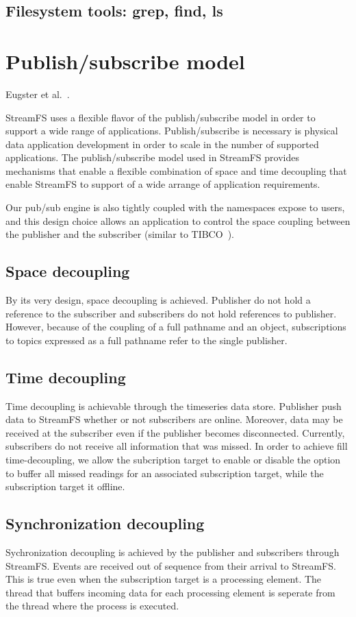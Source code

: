 \documentclass[10pt,print,letterpaper]{sigplan-proc-varsize}
\begin{document}
\subsection{Filesystem tools: grep, find, ls}

\section{Publish/subscribe model}
Eugster et al.~\cite{eugster}.

StreamFS uses a flexible flavor of the publish/subscribe model in order to support a wide range of applications.  
Publish/subscribe is necessary is physical data application development in order to scale in the number of supported
applications.  The publish/subscribe model used in StreamFS provides mechanisms that enable a flexible combination 
of space and time decoupling that enable StreamFS to support of a wide arrange of application requirements.

Our pub/sub engine is also tightly coupled with the namespaces expose to users, and this design choice allows an application
to control the space coupling between the publisher and the subscriber (similar to TIBCO~\cite{tibco}).

\subsection{Space decoupling}
By its very design, space decoupling is achieved.  Publisher do not hold a reference to the subscriber and subscribers do not
hold references to publisher.  However, because of the coupling of a full pathname and an object, subscriptions to topics
expressed as a full pathname refer to the single publisher.

\subsection{Time decoupling}
Time decoupling is achievable through the timeseries data store.  Publisher push data to StreamFS whether or not subscribers are
online.  Moreover, data may be received at the subscriber even if the publisher becomes disconnected.  Currently, subscribers do
not receive all information that was missed.  In order to achieve fill time-decoupling, we allow the subcription
target to enable or disable the option to buffer all missed readings for an associated subscription target, while the subscription
target it offline.

\subsection{Synchronization decoupling}
Sychronization decoupling is achieved by the publisher and subscribers through StreamFS.  Events are received out of sequence
from their arrival to StreamFS.  This is true even when the subscription target is a processing element.  The thread that buffers
incoming data for each processing element is seperate from the thread where the process is executed.
\end{document}

